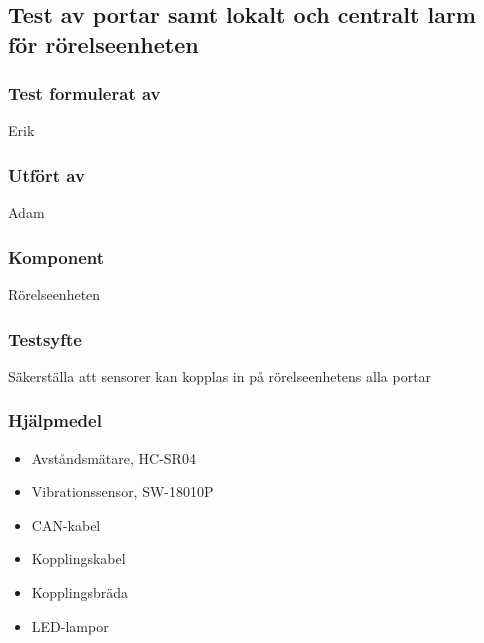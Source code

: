 \clearpage
\subsection{Test av portar samt lokalt och centralt larm för rörelseenheten}
\label{test:PortMotion}

\setlength{\columnsep}{1cm}




\begin{multicols}{2}
\subsubsection*{Test formulerat av}
Erik

\subsubsection*{Utfört av}
Adam


\end{multicols}
\subsubsection*{Komponent}
Rörelseenheten


\subsubsection*{Testsyfte}
Säkerställa att sensorer kan kopplas in på rörelseenhetens alla portar

\subsubsection*{Hjälpmedel}
\begin{itemize}
	\item Avståndsmätare, HC-SR04
	\item Vibrationssensor, SW-18010P
	\item CAN-kabel
	\item Kopplingskabel
	\item Kopplingsbräda
	\item LED-lampor
\end{itemize}



